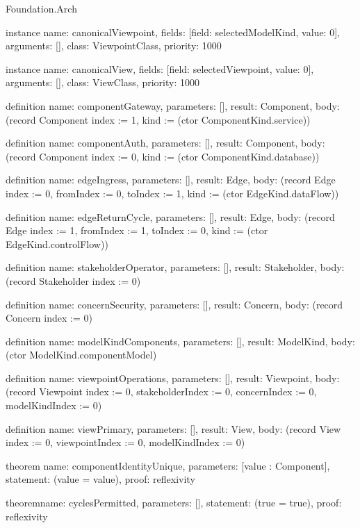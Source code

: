 \begin{lexlean}{Foundation.Arch}
\begin{semanticmodule}
instance{
  name: canonicalViewpoint,
  fields: [{field: selectedModelKind, value: 0}],
  arguments: [],
  class: ViewpointClass,
  priority: 1000
}

instance{
  name: canonicalView,
  fields: [{field: selectedViewpoint, value: 0}],
  arguments: [],
  class: ViewClass,
  priority: 1000
}

definition{
  name: componentGateway,
  parameters: [],
  result: Component,
  body: (record Component {index := 1, kind := (ctor ComponentKind.service)})
}

definition{
  name: componentAuth,
  parameters: [],
  result: Component,
  body: (record Component {index := 0, kind := (ctor ComponentKind.database)})
}

definition{
  name: edgeIngress,
  parameters: [],
  result: Edge,
  body: (record Edge {index := 0, fromIndex := 0, toIndex := 1, kind := (ctor EdgeKind.dataFlow)})
}

definition{
  name: edgeReturnCycle,
  parameters: [],
  result: Edge,
  body: (record Edge {index := 1, fromIndex := 1, toIndex := 0, kind := (ctor EdgeKind.controlFlow)})
}

definition{
  name: stakeholderOperator,
  parameters: [],
  result: Stakeholder,
  body: (record Stakeholder {index := 0})
}

definition{
  name: concernSecurity,
  parameters: [],
  result: Concern,
  body: (record Concern {index := 0})
}

definition{
  name: modelKindComponents,
  parameters: [],
  result: ModelKind,
  body: (ctor ModelKind.componentModel)
}

definition{
  name: viewpointOperations,
  parameters: [],
  result: Viewpoint,
  body: (record Viewpoint {index := 0, stakeholderIndex := 0, concernIndex := 0, modelKindIndex := 0})
}

definition{
  name: viewPrimary,
  parameters: [],
  result: View,
  body: (record View {index := 0, viewpointIndex := 0, modelKindIndex := 0})
}

theorem{
  name: componentIdentityUnique,
  parameters: [value : Component],
  statement: (value = value),
  proof: reflexivity{}
}

theorem{name: cyclesPermitted, parameters: [], statement: (true = true), proof: reflexivity{}}
\end{semanticmodule}
\end{lexlean}
